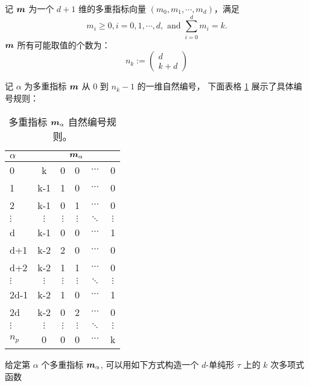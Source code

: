 \documentclass{article}
\begin{document}
记 ${\boldsymbol m}$ 为一个 $d+1$ 维的多重指标向量 $(m_0, m_1, \cdots, m_d)$，满足  
\begin{equation*}
    m_i \geq 0, i=0, 1, \cdots, d, \text{ and } \sum_{i=0}^d m_i=k.
\end{equation*}
${\boldsymbol m}$ 所有可能取值的个数为： 
\begin{equation*}
    n_k := \begin{pmatrix}
        d \\ k+d 
    \end{pmatrix}
\end{equation*}

记 $\alpha$ 为多重指标 ${\boldsymbol m}$ 从 0 到 $n_k-1$ 的一维自然编号， 下面表格
\ref{tb:num} 展示了具体编号规则：
\begin{table}[H]
    \centering
    \begin{tabular}{| l | c | c | c | c | c|}
    \hline
    $\alpha$ & \multicolumn{5}{c|}{${\boldsymbol m}_\alpha$} \\\hline
    0 & k   & 0 & 0 & $\cdots$ & 0 \\\hline
    1 & k-1 & 1 & 0 & $\cdots$ & 0 \\\hline
    2 & k-1 & 0 & 1 & $\cdots$ & 0 \\\hline
    $\vdots$ & $\vdots$ & $\vdots$ & $\vdots$ & $\ddots$ & $\vdots$ \\\hline
    d & k-1 & 0 & 0 & $\cdots$ & 1 \\\hline
    d+1 & k-2 & 2 & 0 & $\cdots$ & 0 \\\hline
    d+2 & k-2 & 1 & 1 & $\cdots$ & 0 \\\hline
    $\vdots$ & $\vdots$ & $\vdots$ & $\vdots$ & $\ddots$ & $\vdots$ \\\hline
    2d-1 & k-2 & 1 & 0 & $\cdots$ & 1 \\\hline
    2d & k-2 & 0 & 2 & $\cdots$ & 0 \\\hline
    $\vdots$ & $\vdots$ & $\vdots$ & $\vdots$ & $\ddots$ & $\vdots$ \\\hline
    $n_p$ & 0 & 0 & 0 & $\cdots$ & k \\
    \hline
    \end{tabular}
    \caption{多重指标 ${\boldsymbol m}_\alpha$ 自然编号规则。}\label{tb:num}
\end{table}

给定第 $\alpha$ 个多重指标 ${\boldsymbol m}_\alpha$, 可以用如下方式构造一个 $d$-单纯形
$\tau$ 上的 $k$ 次多项式函数
\end{document}
